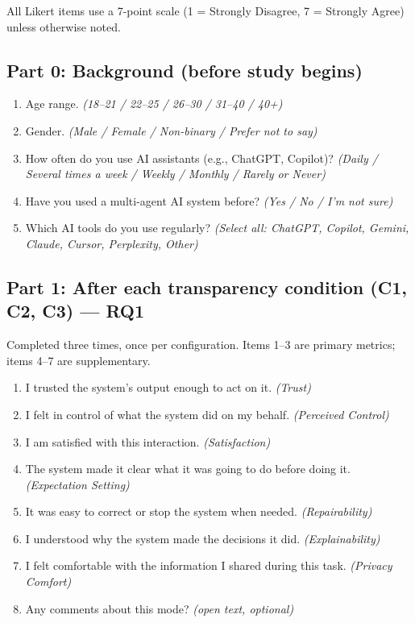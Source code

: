 \documentclass[sigconf, anonymous]{acmart}
\begin{document}
All Likert items use a 7-point scale (1 = Strongly Disagree, 7 = Strongly Agree) unless otherwise noted.

\subsection*{Part 0: Background (before study begins)}

\begin{enumerate}
  \item Age range. \emph{(18--21 / 22--25 / 26--30 / 31--40 / 40+)}
  \item Gender. \emph{(Male / Female / Non-binary / Prefer not to say)}
  \item How often do you use AI assistants (e.g., ChatGPT, Copilot)? \emph{(Daily / Several times a week / Weekly / Monthly / Rarely or Never)}
  \item Have you used a multi-agent AI system before? \emph{(Yes / No / I'm not sure)}
  \item Which AI tools do you use regularly? \emph{(Select all: ChatGPT, Copilot, Gemini, Claude, Cursor, Perplexity, Other)}
\end{enumerate}

\subsection*{Part 1: After each transparency condition (C1, C2, C3) --- RQ1}

Completed three times, once per configuration. Items 1--3 are primary metrics; items 4--7 are supplementary.

\begin{enumerate}
  \item I trusted the system's output enough to act on it. \emph{(Trust)}
  \item I felt in control of what the system did on my behalf. \emph{(Perceived Control)}
  \item I am satisfied with this interaction. \emph{(Satisfaction)}
  \item The system made it clear what it was going to do before doing it. \emph{(Expectation Setting)}
  \item It was easy to correct or stop the system when needed. \emph{(Repairability)}
  \item I understood why the system made the decisions it did. \emph{(Explainability)}
  \item I felt comfortable with the information I shared during this task. \emph{(Privacy Comfort)}
  \item[--] Any comments about this mode? \emph{(open text, optional)}
\end{enumerate}
\end{document}
